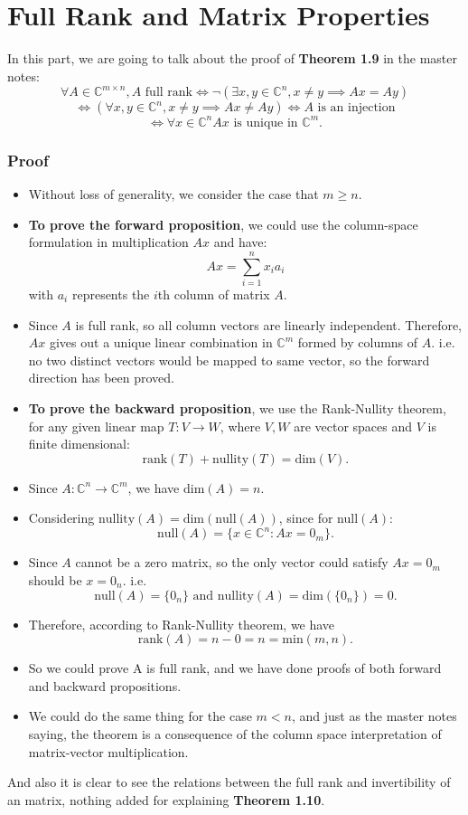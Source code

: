 \section{Full Rank and Matrix Properties}%
In this part, we are going to talk about the proof of  \textbf{Theorem 1.9} in the master notes:
\[
  \forall A \in \mathbb{C}^{m \times n}, A \text{ full rank} \iff \neg (\exists x, y \in \mathbb{C}^{n}, x \neq  y \implies Ax = Ay)
\]
\[
  \iff (\forall x, y \in \mathbb{C}^{n}, x \neq y \implies Ax \neq Ay) \iff A \text{ is an injection}
\]
\[
\iff \forall x \in \mathbb{C}^{n} Ax \text{ is unique in }\mathbb{C}^{m}
.\] 
\subsubsection*{Proof}
\begin{itemize}
  \item Without loss of generality, we consider the case that $m \ge  n$.
  \item \textbf{To prove the forward proposition}, we could use the column-space formulation in multiplication $Ax$ and have:
     \[
    Ax = \sum_{i=1}^{n} x_i a_i
    \]
    with $a_i$ represents the  $i$th column of matrix $A$.
  \item Since $A$ is full rank, so all column vectors are linearly independent. Therefore, $Ax$ gives out a unique linear combination in  $\mathbb{C}^{m}$ formed by columns of $A$. i.e. no two distinct vectors would be mapped to same vector, so the forward direction has been proved.
  \item \textbf{To prove the backward proposition}, we use the Rank-Nullity theorem, for any given linear map $T: V \to  W$, where $V, W$ are vector spaces and  $V$ is finite dimensional:
    \[
      \text{rank}(T) + \text{nullity}(T) = \text{dim}(V)
    .\]
  \item Since $A : \mathbb{C}^{n} \to  \mathbb{C}^{m}$, we have $\text{dim}(A) = n$.
  \item Considering $\text{nullity}(A) = \text{dim}(\text{null}(A))$, since for null$(A)$:
    \[
      \text{null}(A) = \{x \in \mathbb{C}^{n}: Ax = 0_m\} 
    .\]
  \item Since $A$ cannot be a zero matrix, so the only vector could satisfy $Ax = 0_m$ should be  $x = 0_n$. i.e. 
    \[
      \text{null}(A) = \{0_n\} \text{ and nullity}(A) = \text{dim}(\{0_n\}) = 0
    .\]
  \item Therefore, according to Rank-Nullity theorem, we have 
    \[
      \text{rank}(A) = n - 0 = n = \text{min}(m, n)
    .\]
  \item So we could prove A is full rank, and we have done proofs of both forward and backward propositions.
  \item We could do the same thing for the case $m < n$, and just as the master notes saying, the theorem is a consequence of the column space interpretation of matrix-vector multiplication.

\end{itemize}
And also it is clear to see the relations between the full rank and invertibility of an matrix, nothing added for explaining \textbf{Theorem 1.10}.

